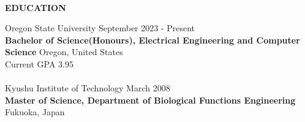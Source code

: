 \begin{flushleft}
	\hrulefill \\
	\begin{large}
		\textbf{EDUCATION}
	\end{large}
\end{flushleft}
Oregon State University \hfill September 2023 - Present\\
\textbf{Bachelor of Science(Honours), Electrical Engineering and Computer Science}  \hfill Oregon, United States\\
Current GPA 3.95\\
\\
Kyushu Institute of Technology \hfill March 2008\\
\textbf{Master of Science, Department of Biological Functions Engineering} \hfill Fukuoka, Japan\\
